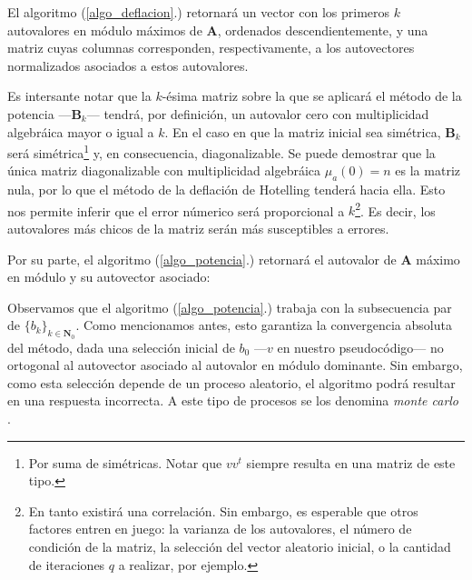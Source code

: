 \vspace{1em}


El algoritmo (\ref{algo_deflacion}.) retornará un vector con los primeros $k$ autovalores en módulo máximos de \textbf{A}, ordenados descendientemente, y una matriz cuyas columnas corresponden, respectivamente, a los autovectores normalizados asociados a estos autovalores. 

\vspace{1em}
Es intersante notar que la $k$-ésima matriz sobre la que se aplicará el método de la potencia ---\textbf{B}$_k$--- tendrá, por definición, un autovalor cero con multiplicidad algebráica mayor o igual a $k$. En el caso en que la matriz inicial sea simétrica, \textbf{B}$_k$ será simétrica\footnote{Por suma de simétricas. Notar que $v v^t$ siempre resulta en una matriz de este tipo.} y, en consecuencia, diagonalizable. Se puede demostrar que la única matriz diagonalizable con multiplicidad algebráica $\mu_{a}(0) = n$ es la matriz nula, por lo que el método de la deflación de Hotelling tenderá hacia ella. Esto nos permite inferir que el error númerico será proporcional a $k$\footnote{En tanto existirá una correlación. Sin embargo, es esperable que otros factores entren en juego: la varianza de los autovalores, el número de condición de la matriz, la selección del vector aleatorio inicial, o la cantidad de iteraciones $q$ a realizar, por ejemplo.}. Es decir, los autovalores más chicos de la matriz serán más susceptibles a errores.  


\vspace{2em}
\noindent Por su parte, el algoritmo (\ref{algo_potencia}.) retornará el autovalor de \textbf{A} máximo en módulo y su autovector asociado:

\vspace{1em}


\vspace{1em}
Observamos que el algoritmo (\ref{algo_potencia}.) trabaja con la subsecuencia par de $\{b_k\}_{k \in \mathbf{N}_0}$. Como mencionamos antes, esto garantiza la convergencia absoluta del método, dada una selección inicial de $b_0$ ---$v$ en nuestro pseudocódigo--- no ortogonal al autovector asociado al autovalor en módulo dominante. Sin embargo, como esta selección depende de un proceso aleatorio, el algoritmo podrá resultar en una respuesta incorrecta. A este tipo de procesos se los denomina \textit{monte carlo} \cite{Brassard}. 


